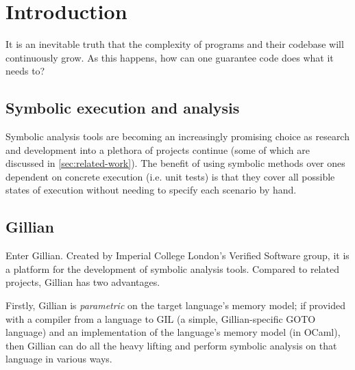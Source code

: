 \chapter{Introduction}
\label{cha:intro}




It is an inevitable truth that the complexity of programs and their codebase
will continuously grow. As this happens, how can one guarantee code does what
it needs to?

\section{Symbolic execution and analysis}

Symbolic analysis tools are becoming an increasingly promising choice as
research and development into a plethora of projects continue (some of which
are discussed in \autoref{sec:related-work}). The benefit of using symbolic
methods over ones dependent on concrete execution (i.e. unit tests) is that
they cover all possible states of execution without needing to specify each
scenario by hand.


\section{Gillian}
Enter Gillian. Created by Imperial College London's Verified Software group, it
is a platform for the development of symbolic analysis tools. Compared to
related projects, Gillian has two advantages.

Firstly, Gillian is \textit{parametric} on the target language's memory model;
if provided with a compiler from a language to GIL (a simple, Gillian-specific
GOTO language) and an implementation of the language's memory model (in OCaml),
then Gillian can do all the heavy lifting and perform symbolic analysis on that
language in various ways\cite{gillian-part1}.

